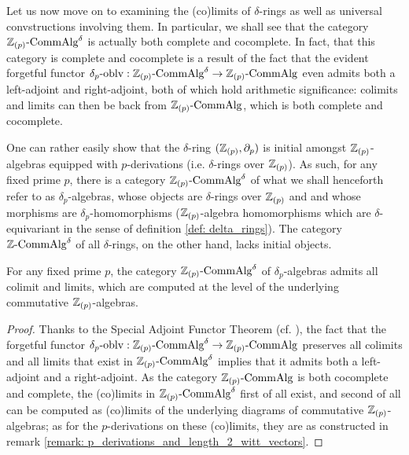             Let us now move on to examining the (co)limits of $\delta$-rings as well as universal convstructions involving them. In particular, we shall see that the category $\mathbb{Z}_{(p)}\text{-}\mathrm{Comm}\mathrm{Alg}^{\delta}$ is actually both complete and cocomplete. In fact, that this category is complete and cocomplete is a result of the fact that the evident forgetful functor $\delta_p\text{-}\mathrm{oblv}: \mathbb{Z}_{(p)}\text{-}\mathrm{Comm}\mathrm{Alg}^{\delta} \to \mathbb{Z}_{(p)}\text{-}\mathrm{Comm}\mathrm{Alg}$ even admits both a left-adjoint and right-adjoint, both of which hold arithmetic significance: colimits and limits can then be  back from $\mathbb{Z}_{(p)}\text{-}\mathrm{Comm}\mathrm{Alg}$, which is both complete and cocomplete.
            \begin{remark} \label{remark: initial_delta_ring}
                One can rather easily show that the $\delta$-ring $(\mathbb{Z}_{(p)}, \partial_p)$ is initial amongst $\mathbb{Z}_{(p)}$-algebras equipped with $p$-derivations (i.e. $\delta$-rings over $\mathbb{Z}_{(p)}$). As such, for any fixed prime $p$, there is a category $\mathbb{Z}_{(p)}\text{-}\mathrm{Comm}\mathrm{Alg}^{\delta}$ of what we shall henceforth refer to as $\delta_p$-algebras, whose objects are $\delta$-rings over $\mathbb{Z}_{(p)}$ and and whose morphisms are $\delta_p$-homomorphisms ($\mathbb{Z}_{(p)}$-algebra homomorphisms which are $\delta$-equivariant in the sense of definition \ref{def: delta_rings}). The  category $\mathbb{Z}\text{-}\mathrm{Comm}\mathrm{Alg}^{\delta}$ of all $\delta$-rings, on the other hand, lacks initial objects. 
            \end{remark}
            \begin{remark} \label{remark: p_derivations_and_length_2_witt_vectors} 
                
            \end{remark}
            \begin{proposition} \label{prop: (co)limits_of_delta_rings}
                For any fixed prime $p$, the category $\mathbb{Z}_{(p)}\text{-}\mathrm{Comm}\mathrm{Alg}^{\delta}$ of $\delta_p$-algebras admits all colimit and limits, which are computed at the level of the underlying commutative $\mathbb{Z}_{(p)}$-algebras. 
            \end{proposition}
                \begin{proof}
                    Thanks to the Special Adjoint Functor Theorem (cf. \cite{nlab:adjoint_functor_theorem}), the fact that the forgetful functor $\delta_p\text{-}\mathrm{oblv}: \mathbb{Z}_{(p)}\text{-}\mathrm{Comm}\mathrm{Alg}^{\delta} \to \mathbb{Z}_{(p)}\text{-}\mathrm{Comm}\mathrm{Alg}$ preserves all colimits and all limits that exist in $\mathbb{Z}_{(p)}\text{-}\mathrm{Comm}\mathrm{Alg}^{\delta}$ implies that it admits both a left-adjoint and a right-adjoint. As the category $\mathbb{Z}_{(p)}\text{-}\mathrm{Comm}\mathrm{Alg}$ is both cocomplete and complete, the (co)limits in $\mathbb{Z}_{(p)}\text{-}\mathrm{Comm}\mathrm{Alg}^{\delta}$ first of all exist, and second of all can be computed as (co)limits of the underlying diagrams of commutative $\mathbb{Z}_{(p)}$-algebras; as for the $p$-derivations on these (co)limits, they are as constructed in remark \ref{remark: p_derivations_and_length_2_witt_vectors}.
                \end{proof}
